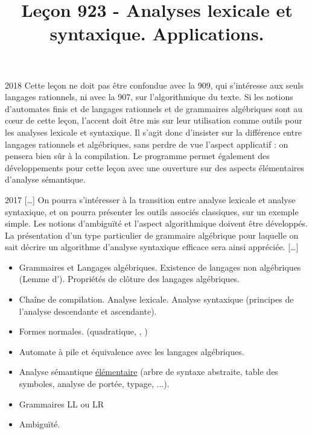 \documentclass{agregfiche}
\title{Leçon 923 - Analyses lexicale et syntaxique. Applications.}
\begin{document}
\maketitle

\secrapports
\begin{rapport}{2018}
    Cette leçon ne doit pas être confondue avec la 909, qui s’intéresse aux seuls langages rationnels, ni avec
    la 907, sur l’algorithmique du texte.
    Si les notions d’automates finis et de langages rationnels et de grammaires algébriques sont au cœur
    de cette leçon, l’accent doit être mis sur leur utilisation comme outils pour les analyses lexicale et
    syntaxique. Il s’agit donc d’insister sur la différence entre langages rationnels et algébriques, sans perdre
    de vue l’aspect applicatif : on pensera bien sûr à la compilation. Le programme permet également des
    développements pour cette leçon avec une ouverture sur des aspects élémentaires d’analyse sémantique.
\end{rapport}

\begin{rapport}{2017}
[\dots]    On pourra s’intéresser à la transition entre analyse lexicale et analyse syntaxique, et on pourra présenter les outils associés classiques, sur un exemple
    simple. Les notions d’ambiguïté et l’aspect algorithmique doivent être développés. La présentation
    d’un type particulier de grammaire algébrique pour laquelle on sait décrire un algorithme d’analyse
    syntaxique efficace sera ainsi appréciée. [\dots]
    \end{rapport}

\secindispensables

\begin{itemize}
	\item Grammaires et Langages algébriques. Existence de langages non algébriques (Lemme d'). Propriétés de clôture
    des langages algébriques.
    \item Chaîne de compilation. Analyse lexicale. Analyse syntaxique (principes de l’analyse descendante
    et ascendante). 
\end{itemize}

\secasavoir

\begin{itemize}
    \item Formes normales. (quadratique, , )
	\item Automate à pile et équivalence avec les langages algébriques.
    \item Analyse sémantique \underline{élémentaire} (arbre de syntaxe abstraite, table des symboles,
    analyse de portée, typage, ...).
    \item Grammaires LL ou LR
    \item Ambiguïté.
\end{itemize}
\end{document}
